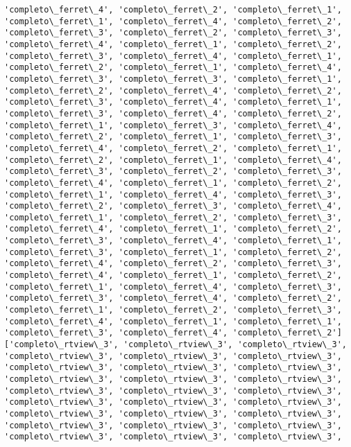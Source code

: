 \documentclass[11pt]{article}
\begin{document}
\begin{Verbatim}[commandchars=\\\{\}]
'completo\_ferret\_4', 'completo\_ferret\_2', 'completo\_ferret\_1',
'completo\_ferret\_1', 'completo\_ferret\_4', 'completo\_ferret\_2',
'completo\_ferret\_3', 'completo\_ferret\_2', 'completo\_ferret\_3',
'completo\_ferret\_4', 'completo\_ferret\_1', 'completo\_ferret\_2',
'completo\_ferret\_3', 'completo\_ferret\_4', 'completo\_ferret\_1',
'completo\_ferret\_2', 'completo\_ferret\_1', 'completo\_ferret\_4',
'completo\_ferret\_3', 'completo\_ferret\_3', 'completo\_ferret\_1',
'completo\_ferret\_2', 'completo\_ferret\_4', 'completo\_ferret\_2',
'completo\_ferret\_3', 'completo\_ferret\_4', 'completo\_ferret\_1',
'completo\_ferret\_3', 'completo\_ferret\_4', 'completo\_ferret\_2',
'completo\_ferret\_1', 'completo\_ferret\_3', 'completo\_ferret\_4',
'completo\_ferret\_2', 'completo\_ferret\_1', 'completo\_ferret\_3',
'completo\_ferret\_4', 'completo\_ferret\_2', 'completo\_ferret\_1',
'completo\_ferret\_2', 'completo\_ferret\_1', 'completo\_ferret\_4',
'completo\_ferret\_3', 'completo\_ferret\_2', 'completo\_ferret\_3',
'completo\_ferret\_4', 'completo\_ferret\_1', 'completo\_ferret\_2',
'completo\_ferret\_1', 'completo\_ferret\_4', 'completo\_ferret\_3',
'completo\_ferret\_2', 'completo\_ferret\_3', 'completo\_ferret\_4',
'completo\_ferret\_1', 'completo\_ferret\_2', 'completo\_ferret\_3',
'completo\_ferret\_4', 'completo\_ferret\_1', 'completo\_ferret\_2',
'completo\_ferret\_3', 'completo\_ferret\_4', 'completo\_ferret\_1',
'completo\_ferret\_3', 'completo\_ferret\_1', 'completo\_ferret\_2',
'completo\_ferret\_4', 'completo\_ferret\_2', 'completo\_ferret\_3',
'completo\_ferret\_4', 'completo\_ferret\_1', 'completo\_ferret\_2',
'completo\_ferret\_1', 'completo\_ferret\_4', 'completo\_ferret\_3',
'completo\_ferret\_3', 'completo\_ferret\_4', 'completo\_ferret\_2',
'completo\_ferret\_1', 'completo\_ferret\_2', 'completo\_ferret\_3',
'completo\_ferret\_4', 'completo\_ferret\_1', 'completo\_ferret\_1',
'completo\_ferret\_3', 'completo\_ferret\_4', 'completo\_ferret\_2']
['completo\_rtview\_3', 'completo\_rtview\_3', 'completo\_rtview\_3',
'completo\_rtview\_3', 'completo\_rtview\_3', 'completo\_rtview\_3',
'completo\_rtview\_3', 'completo\_rtview\_3', 'completo\_rtview\_3',
'completo\_rtview\_3', 'completo\_rtview\_3', 'completo\_rtview\_3',
'completo\_rtview\_3', 'completo\_rtview\_3', 'completo\_rtview\_3',
'completo\_rtview\_3', 'completo\_rtview\_3', 'completo\_rtview\_3',
'completo\_rtview\_3', 'completo\_rtview\_3', 'completo\_rtview\_3',
'completo\_rtview\_3', 'completo\_rtview\_3', 'completo\_rtview\_3',
'completo\_rtview\_3', 'completo\_rtview\_3', 'completo\_rtview\_3',

\end{Verbatim}
\end{document}
